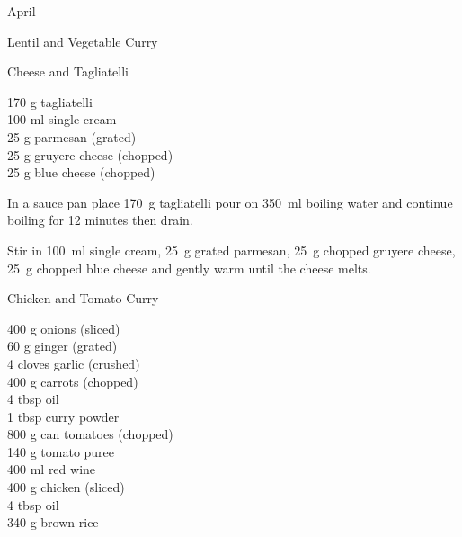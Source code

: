 \begin{menu}{April}
\begin{recipe}{2}{Lentil and Vegetable Curry}
\begin{instructions}
    \end{instructions}
    \end{recipe}%
  
    \begin{recipe}{1}{Cheese and Tagliatelli}%
		\begin{ingredients}
		170 g tagliatelli  \\
	100 ml single cream  \\
	25 g parmesan (grated) \\
	25 g gruyere cheese (chopped) \\
	25 g blue cheese (chopped) \\
	
		\end{ingredients}
	
	
	
    \begin{instructions}
    \item 
    In a
    sauce pan
    place
    170~g  tagliatelli
    pour on
    350~ml  boiling water and continue boiling for 12 minutes then drain.
  \item 
        Stir in
        100~ml  single cream,
        25~g grated parmesan,
        25~g chopped gruyere cheese,
        25~g chopped blue cheese
        and gently warm until the cheese melts.
      
    \end{instructions}
    \end{recipe}%
  
    \begin{recipe}{2}{Chicken and Tomato Curry}%
		\begin{ingredients}
		400 g onions (sliced) \\
	60 g ginger (grated) \\
	4 cloves garlic (crushed) \\
	400 g carrots (chopped) \\
	4 tbsp oil  \\
	1 tbsp curry powder  \\
	800 g can tomatoes (chopped) \\
	140 g tomato puree  \\
	400 ml red wine  \\
	400 g chicken (sliced) \\
	4 tbsp oil  \\
	340 g brown rice  \\
	

\end{ingredients}
\end{recipe}
\end{menu}
